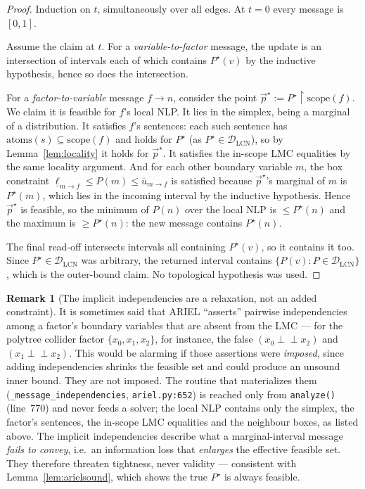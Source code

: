 \documentclass[11pt]{article}
\theoremstyle{definition}
\newtheorem{remark}{Remark}
\newcommand{\lo}{\underline}
\newcommand{\hi}{\overline}
\newcommand{\indep}{\perp\!\!\!\perp}
\newcommand{\DLCN}{\mathcal{D}_{\mathrm{LCN}}}
\newcommand{\atoms}{\mathrm{atoms}}
\newcommand{\restr}{\!\restriction\!}
\begin{document}
\begin{proof}
Induction on $t$, simultaneously over all edges. At $t=0$ every message is $[0,1]$.

Assume the claim at $t$. For a \emph{variable-to-factor} message, the update is an intersection of
intervals each of which contains $P^\star(v)$ by the inductive hypothesis, hence so does the
intersection.

For a \emph{factor-to-variable} message $f\!\to\!n$, consider the point
$\vec p^\star:=P^\star\restr\mathrm{scope}(f)$. We claim it is feasible for $f$'s local NLP. It lies in
the simplex, being a marginal of a distribution. It satisfies $f$'s sentences: each such sentence has
$\atoms(s)\subseteq\mathrm{scope}(f)$ and holds for $P^\star$ (as $P^\star\in\DLCN$), so by
Lemma~\ref{lem:locality} it holds for $\vec p^\star$. It satisfies the in-scope LMC equalities by the
same locality argument. And for each other boundary variable $m$, the box constraint
$\lo\ell_{m\to f}\le P(m)\le\hi u_{m\to f}$ is satisfied because
$\vec p^\star$'s marginal of $m$ is $P^\star(m)$, which lies in the incoming interval by the inductive
hypothesis. Hence $\vec p^\star$ is feasible, so the minimum of $P(n)$ over the local NLP is
$\le P^\star(n)$ and the maximum is $\ge P^\star(n)$: the new message contains $P^\star(n)$.

The final read-off intersects intervals all containing $P^\star(v)$, so it contains it too. Since
$P^\star\in\DLCN$ was arbitrary, the returned interval contains $\{P(v):P\in\DLCN\}$, which is the
outer-bound claim. No topological hypothesis was used.
\end{proof}

\begin{remark}[The implicit independencies are a relaxation, not an added constraint]
\label{rem:arielindep}
It is sometimes said that ARIEL ``asserts'' pairwise independencies among a factor's boundary
variables that are absent from the LMC --- for the polytree collider factor $\{x_0,x_1,x_2\}$, for
instance, the false $(x_0\indep x_2)$ and $(x_1\indep x_2)$. This would be alarming if those
assertions were \emph{imposed}, since adding independencies shrinks the feasible set and could produce
an unsound inner bound. They are not imposed. The routine that materializes them
(\texttt{\_message\_independencies}, \texttt{ariel.py:652}) is reached only from \texttt{analyze()}
(line~770) and never feeds a solver; the local NLP contains only the simplex, the factor's sentences,
the in-scope LMC equalities and the neighbour boxes, as listed above. The implicit independencies
describe what a marginal-interval message \emph{fails to convey}, i.e.\ an information loss that
\emph{enlarges} the effective feasible set. They therefore threaten tightness, never validity ---
consistent with Lemma~\ref{lem:arielsound}, which shows the true $P^\star$ is always feasible.
\end{remark}
\end{document}
